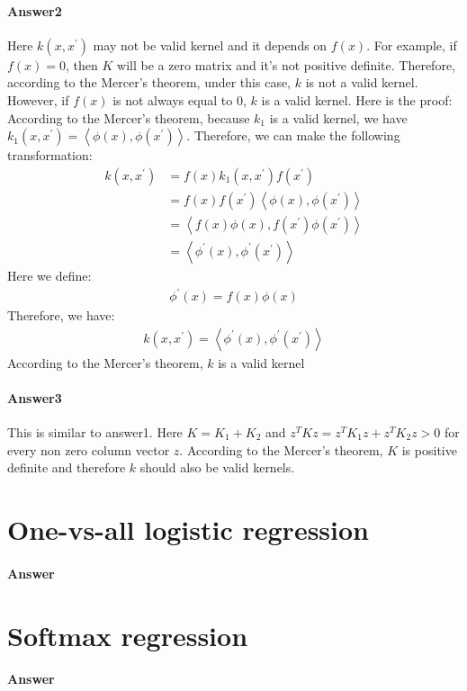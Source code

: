 \documentclass[paper=a4, fontsize=11pt]{scrartcl} %
\numberwithin{equation}{section} %
\numberwithin{figure}{section} %
\numberwithin{table}{section} %
\begin{document}
\paragraph{\textbf{Answer2}}
Here $k\left ( x, x^{'} \right )$ may not be valid kernel and it depends on $f\left ( x \right )$. For example, if $f\left ( x \right )=0$, then $K$ will be a zero matrix and it's not positive definite. Therefore, according to the Mercer's theorem, under this case, $k$ is not a valid kernel.
\\ However, if $f\left ( x \right )$ is not always equal to 0, $k$ is a valid kernel. Here is the proof:
\\According to the Mercer's theorem, because $k_{1}$ is a valid kernel, we have $k_{1}\left ( x,x^{'} \right )=\left \langle \phi \left ( x \right ),\phi \left ( x^{'} \right ) \right \rangle$. Therefore, we can make the following transformation:
\begin{align*}
k\left ( x,x^{'} \right )
&=f\left ( x \right )k_{1}\left ( x,x^{'} \right )f\left ( x^{'} \right )
\\&=f\left ( x \right )f\left ( x^{'} \right )\left \langle \phi \left ( x \right ),\phi \left ( x^{'} \right ) \right \rangle
\\&=\left \langle f\left ( x \right )\phi \left ( x \right ),f\left ( x^{'} \right )\phi \left ( x^{'} \right ) \right \rangle
\\&=\left \langle \phi ^{'}\left ( x \right ) ,\phi ^{'}\left ( x^{'} \right )\right \rangle
\end{align*}
Here we define:
\begin{align*}
\phi ^{'}\left ( x \right )=f\left ( x \right )\phi \left ( x \right )
\end{align*}
Therefore, we have:
\begin{align*}
k\left ( x,x^{'} \right )=\left \langle \phi ^{'}\left ( x \right ) ,\phi ^{'}\left ( x^{'} \right )\right \rangle
\end{align*}
According to the Mercer's theorem, $k$ is a valid kernel

\paragraph{\textbf{Answer3}}
This is similar to answer1. Here $K=K_{1}+K_{2}$ and $z^{T}Kz=z^{T}K_{1}z+z^{T}K_{2}z>0$ for every non zero column vector $z$. According to the Mercer's theorem, $K$ is positive definite and therefore $k$ should also be valid kernels.

\section{One-vs-all logistic regression}

\paragraph{\textbf{Answer}}

\section{Softmax regression}

\paragraph{\textbf{Answer}}
\end{document}
